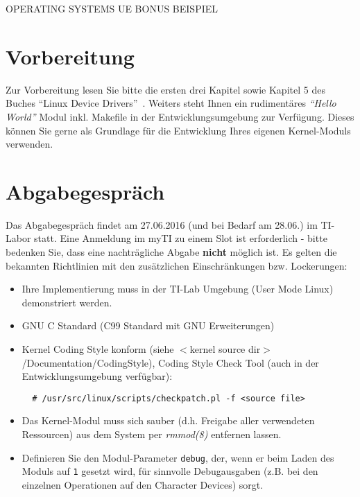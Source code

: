 \documentclass{article}
\begin{document}
\begin{center}
\begin{Large}
OPERATING SYSTEMS UE BONUS BEISPIEL
\end{Large}
\end{center}


\section*{Vorbereitung}
Zur Vorbereitung lesen Sie bitte die ersten drei Kapitel sowie Kapitel
5 des Buches "`Linux Device
Drivers"'~\cite{Corbet:2005:LDD:1209083}. Weiters steht Ihnen ein
rudiment{\"a}res \emph{"`Hello World"'} Modul inkl. Makefile in
der Entwicklungsumgebung zur Verf{\"u}gung. Dieses k{\"o}nnen Sie gerne als
Grundlage f{\"u}r die Entwicklung Ihres eigenen Kernel-Moduls
verwenden.

\section*{Abgabegespr{\"a}ch}
Das Abgabegespr{\"a}ch findet am 27.06.2016 (und bei Bedarf am 28.06.) im TI-Labor statt.
Eine Anmeldung im myTI zu einem Slot ist erforderlich -
bitte bedenken Sie, dass eine nachtr{\"a}gliche Abgabe {\bf nicht}
m{\"o}glich ist. Es gelten die
bekannten Richtlinien mit den zus{\"a}tzlichen Einschr{\"a}nkungen
bzw. Lockerungen:
\begin{itemize}
\item Ihre Implementierung muss in der TI-Lab Umgebung (User Mode Linux)
  demonstriert werden.
\item GNU C Standard (C99 Standard mit GNU Erweiterungen)
\item Kernel Coding Style konform (siehe $<$kernel source
  dir$>$/Documentation/CodingStyle), Coding Style Check Tool
  (auch in der Entwicklungsumgebung verf{\"u}gbar):
  \begin{verbatim}
  # /usr/src/linux/scripts/checkpatch.pl -f <source file>
  \end{verbatim}
\item Das Kernel-Modul muss sich sauber (d.h. Freigabe aller
  verwendeten Ressourcen) aus dem System per \emph{rmmod(8)} entfernen
  lassen.
\item Definieren Sie den Modul-Parameter \verb|debug|, der, wenn er
  beim Laden des Moduls auf \texttt{1} gesetzt wird, f{\"u}r sinnvolle
  Debugausgaben (z.B. bei den einzelnen Operationen auf den Character
  Devices) sorgt.
\end{itemize}
\end{document}
